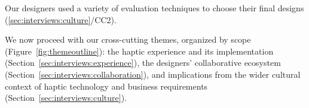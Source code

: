 %
Our designers used a variety of evaluation techniques to choose their final designs (\ref{sec:interviews:culture}/CC2).

We now proceed with our  cross-cutting themes, organized by scope (Figure~\ref{fig:themeoutline}): the haptic experience and its implementation (Section~\ref{sec:interviews:experience}), the designers' collaborative ecosystem (Section~\ref{sec:interviews:collaboration}), and implications from the wider cultural context of haptic technology and business requirements (Section~\ref{sec:interviews:culture}).



